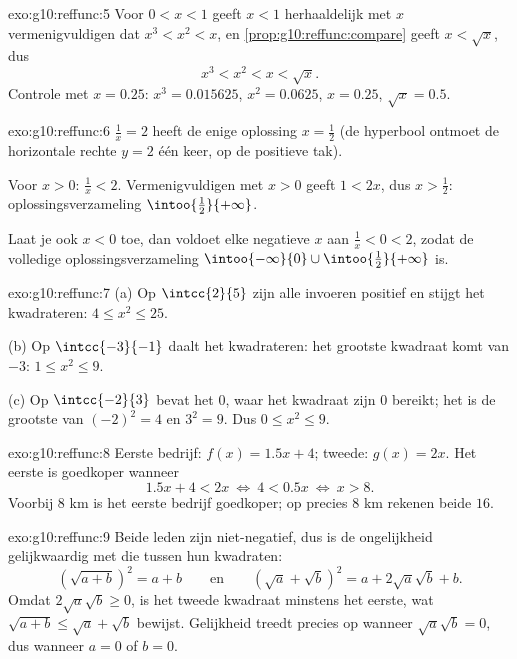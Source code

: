 \begin{solution}{exo:g10:reffunc:5}
Voor $0 < x < 1$ geeft $x < 1$ herhaaldelijk met $x$ vermenigvuldigen dat
$x^3 < x^2 < x$, en \cref{prop:g10:reffunc:compare} geeft $x < \sqrt x$, dus
\[
x^3 < x^2 < x < \sqrt x .
\]
Controle met $x = 0.25$: $x^3 = 0.015625$, $x^2 = 0.0625$, $x = 0.25$,
$\sqrt x = 0.5$.
\end{solution}

\begin{solution}{exo:g10:reffunc:6}
$\frac1x = 2$ heeft de enige oplossing $x = \frac12$ (de hyperbool ontmoet
de horizontale rechte $y = 2$ één keer, op de positieve tak).

Voor $x > 0$: $\frac1x < 2$. Vermenigvuldigen met $x > 0$ geeft $1 < 2x$,
dus $x > \frac12$: oplossingsverzameling $\intoo{\frac12}{+\infty}$.

Laat je ook $x < 0$ toe, dan voldoet elke negatieve $x$ aan
$\frac1x < 0 < 2$, zodat de volledige oplossingsverzameling
$\intoo{-\infty}{0} \cup \intoo{\frac12}{+\infty}$ is.
\end{solution}

\begin{solution}{exo:g10:reffunc:7}
(a) Op $\intcc{2}{5}$ zijn alle invoeren positief en stijgt het kwadrateren:
$4 \leq x^2 \leq 25$.

(b) Op $\intcc{-3}{-1}$ daalt het kwadrateren: het grootste kwadraat komt
van $-3$: $1 \leq x^2 \leq 9$.

(c) Op $\intcc{-2}{3}$ bevat het  $0$, waar het kwadraat zijn
 $0$ bereikt; het  is de grootste van $(-2)^2 = 4$ en
$3^2 = 9$. Dus $0 \leq x^2 \leq 9$.
\end{solution}

\begin{solution}{exo:g10:reffunc:8}
Eerste bedrijf: $f(x) = 1.5x + 4$; tweede: $g(x) = 2x$. Het eerste is
goedkoper wanneer
\[
1.5x + 4 < 2x
\ \Longleftrightarrow\
4 < 0.5x
\ \Longleftrightarrow\
x > 8 .
\]
Voorbij $8$ km is het eerste bedrijf goedkoper; op precies $8$ km rekenen
beide $16$.
\end{solution}

\begin{solution}{exo:g10:reffunc:9}
Beide leden zijn niet-negatief, dus is de ongelijkheid gelijkwaardig met die
tussen hun kwadraten:
\[
\left(\sqrt{a+b}\right)^2 = a + b
\qquad\text{en}\qquad
\left(\sqrt a + \sqrt b\right)^2 = a + 2\sqrt a \sqrt b + b .
\]
Omdat $2\sqrt a\sqrt b \geq 0$, is het tweede kwadraat minstens het eerste,
wat $\sqrt{a+b} \leq \sqrt a + \sqrt b$ bewijst. Gelijkheid treedt precies op
wanneer $\sqrt a \sqrt b = 0$, dus wanneer $a = 0$ of $b = 0$.
\end{solution}

